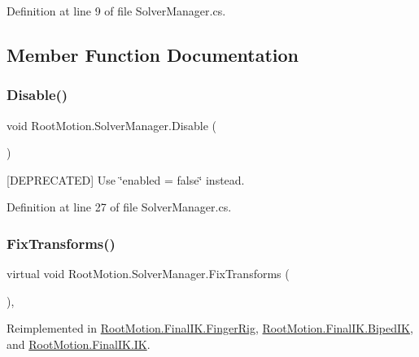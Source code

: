 Definition at line 9 of file Solver\+Manager.\+cs.



\subsection{Member Function Documentation}
\mbox{\label{class_root_motion_1_1_solver_manager_a23240e6e1a897a0bb5d646b6c5af659f}} 
\subsubsection{\texorpdfstring{Disable()}{Disable()}}
{\footnotesize\ttfamily void Root\+Motion.\+Solver\+Manager.\+Disable (\begin{DoxyParamCaption}{ }\end{DoxyParamCaption})}



\mbox{[}D\+E\+P\+R\+E\+C\+A\+T\+ED\mbox{]} Use \char`\"{}enabled = false\char`\"{} instead. 



Definition at line 27 of file Solver\+Manager.\+cs.

\mbox{\label{class_root_motion_1_1_solver_manager_addb54e92acd91364a9205c5807a42776}} 
\subsubsection{\texorpdfstring{Fix\+Transforms()}{FixTransforms()}}
{\footnotesize\ttfamily virtual void Root\+Motion.\+Solver\+Manager.\+Fix\+Transforms (\begin{DoxyParamCaption}{ }\end{DoxyParamCaption})\hspace{0.3cm}{\ttfamily [protected]}, {\ttfamily [virtual]}}



Reimplemented in \mbox{\hyperlink{class_root_motion_1_1_final_i_k_1_1_finger_rig_ab11b46b8b2c81897b17c451c4c536b1f}{Root\+Motion.\+Final\+I\+K.\+Finger\+Rig}}, \mbox{\hyperlink{class_root_motion_1_1_final_i_k_1_1_biped_i_k_a0fd11761ce3af861bede6abce987608c}{Root\+Motion.\+Final\+I\+K.\+Biped\+IK}}, and \mbox{\hyperlink{class_root_motion_1_1_final_i_k_1_1_i_k_ac5d8c4a224b291865a31909a231acf07}{Root\+Motion.\+Final\+I\+K.\+IK}}.



